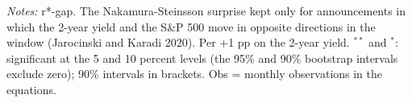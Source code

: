 \begin{flushleft}\footnotesize\textit{Notes:} r*-gap. The Nakamura-Steinsson surprise kept only for announcements in which the 2-year yield and the S\&P 500 move in opposite directions in the window (Jarocinski and Karadi 2020). Per +1 pp on the 2-year yield. $^{**}$ and $^{*}$: significant at the 5 and 10 percent levels (the 95\% and 90\% bootstrap intervals exclude zero); 90\% intervals in brackets. Obs = monthly observations in the equations.\end{flushleft}
\endgroup
